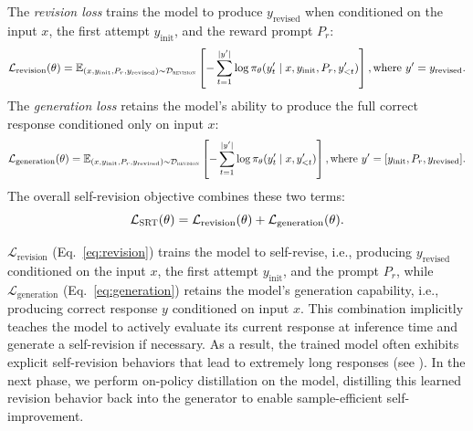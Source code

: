 The \emph{revision loss} trains the model to produce $y_\text{revised}$ when conditioned on the input $x$, the first attempt $y_\text{init}$, and the reward prompt $P_r$:
{\small
\begin{equation}
\mathcal{L}_{\text{revision}}(\theta)=
\mathbb{E}_{(x,y_\text{init},P_r, y_\text{revised})\sim \mathcal{D}_{\textsc{revision}}}
\left[
-\sum_{t=1}^{|y'|}
\log \pi_\theta\!\left(y'_t \mid x, y_\text{init}, P_r, y'_{<t}\right)
\right],\text{where } y' = y_\text{revised}.
\label{eq:revision}
\end{equation}
}
The \emph{generation loss} retains the model's ability to produce the full correct response conditioned only on input $x$:
{
\fontsize{8.8pt}{9pt}\selectfont
\begin{equation}
\mathcal{L}_{\text{generation}}(\theta)=
\mathbb{E}_{(x,y_\text{init},P_r, y_\text{revised})\sim \mathcal{D}_{\textsc{revision}}}
\left[
-\sum_{t=1}^{|y'|}
\log \pi_\theta\!\left(y'_t \mid x, y'_{<t}\right)
\right],\text{where } y' = [y_\text{init},P_r, y_\text{revised}].
\label{eq:generation}
\end{equation}
}
The overall self-revision objective combines these two terms:
{
\begin{equation}
\mathcal{L}_{\text{\textsc{SRT}{}}}(\theta)=
\mathcal{L}_{\text{revision}}(\theta) + \mathcal{L}_{\text{generation}}(\theta).
\label{eq:sft}
\end{equation}}

 $\mathcal{L}_{\text{revision}}$ (Eq.~\ref{eq:revision}) trains the model to self-revise, i.e., producing $y_\text{revised}$ conditioned on the input $x$, the first attempt $y_\text{init}$, and the prompt $P_r$, while $\mathcal{L}_{\text{generation}}$ (Eq.~\ref{eq:generation}) retains the model's generation capability, i.e., producing correct response $y$ conditioned on input $x$. This combination implicitly teaches the model to actively evaluate its current response at inference time and generate a self-revision if necessary. As a result, the trained model often exhibits explicit self-revision behaviors that lead to extremely long responses (see ). In the next phase, we perform on-policy distillation on the \sft{} model, distilling this learned revision behavior back into the generator to enable sample-efficient self-improvement.


